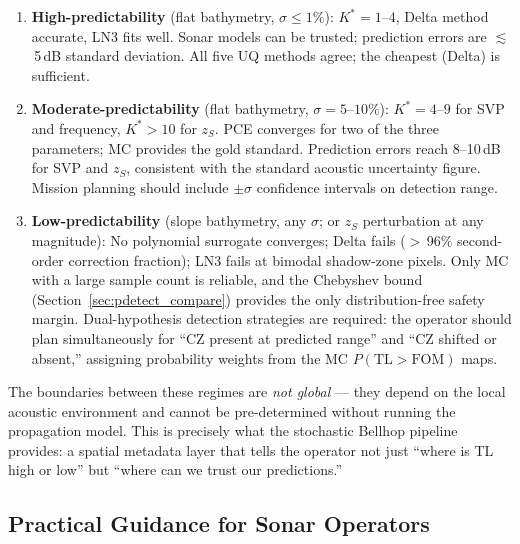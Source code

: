 \documentclass[11pt,a4paper]{article}
\begin{document}
\begin{enumerate}

  \item \textbf{High-predictability} (flat bathymetry, $\sigma \leq 1\%$):
        $K^* = 1$--$4$, Delta method accurate, LN3 fits well.
        Sonar models can be trusted; prediction errors are $\lesssim$\,5\,dB standard
        deviation.
        All five UQ methods agree; the cheapest (Delta) is sufficient.

  \item \textbf{Moderate-predictability} (flat bathymetry, $\sigma = 5$--$10\%$):
        $K^* = 4$--$9$ for SVP and frequency, $K^* > 10$ for $z_S$.
        PCE converges for two of the three parameters; MC provides the gold standard.
        Prediction errors reach 8--10\,dB for SVP and $z_S$, consistent with the
        standard acoustic uncertainty figure.
        Mission planning should include $\pm\sigma$ confidence intervals on detection range.

  \item \textbf{Low-predictability} (slope bathymetry, any $\sigma$; or
        $z_S$ perturbation at any magnitude):
        No polynomial surrogate converges; Delta fails ($>$\,96\% second-order correction
        fraction); LN3 fails at bimodal shadow-zone pixels.
        Only MC with a large sample count is reliable, and the Chebyshev bound
        (Section~\ref{sec:pdetect_compare}) provides the only distribution-free safety
        margin.
        Dual-hypothesis detection strategies are required: the operator should plan
        simultaneously for ``CZ present at predicted range'' and ``CZ shifted or absent,''
        assigning probability weights from the MC $P(\mathrm{TL} > \mathrm{FOM})$ maps.

\end{enumerate}

The boundaries between these regimes are \emph{not global} --- they depend on the local
acoustic environment and cannot be pre-determined without running the propagation model.
This is precisely what the stochastic Bellhop pipeline provides: a spatial metadata layer
that tells the operator not just ``where is TL high or low'' but ``where can we trust our
predictions.''

\subsection{Practical Guidance for Sonar Operators}
\label{sec:operator_guidance}
\end{document}
